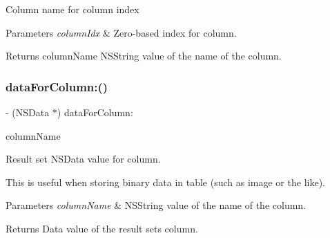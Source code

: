 Column name for column index


\begin{DoxyParams}{Parameters}
{\em column\+Idx} & Zero-\/based index for column.\\
\hline
\end{DoxyParams}
\begin{DoxyReturn}{Returns}
column\+Name {\ttfamily N\+S\+String} value of the name of the column. 
\end{DoxyReturn}
\mbox{\label{interface_o_p_t_l_y_f_m_d_b_result_set_aabb9796a0926d185627cb5e24c88f978}} 
\subsubsection{\texorpdfstring{data\+For\+Column\+:()}{dataForColumn:()}}
{\footnotesize\ttfamily -\/ (N\+S\+Data $\ast$) data\+For\+Column\+: \begin{DoxyParamCaption}\item[{(N\+S\+String$\ast$)}]{column\+Name }\end{DoxyParamCaption}}

Result set {\ttfamily N\+S\+Data} value for column.

This is useful when storing binary data in table (such as image or the like).


\begin{DoxyParams}{Parameters}
{\em column\+Name} & {\ttfamily N\+S\+String} value of the name of the column.\\
\hline
\end{DoxyParams}
\begin{DoxyReturn}{Returns}
Data value of the result set\textquotesingle{}s column. 
\end{DoxyReturn}
\mbox{\label{interface_o_p_t_l_y_f_m_d_b_result_set_aa66982b843b56f09bdeb3ee7b5b8fa36}} 
